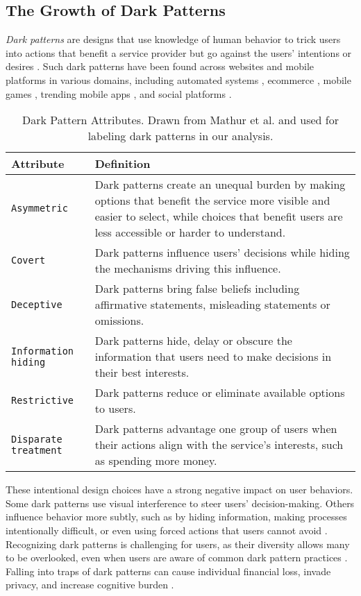 \subsection{The Growth of Dark Patterns} %
\textit{Dark patterns} are designs that use knowledge of human behavior to trick users into actions that benefit a service provider but go against the users' intentions or desires {\cite{a:10, a:11}}. Such dark patterns have been found across websites and mobile platforms in various domains, including automated systems \cite{a:45}, ecommerce \cite{a:9}, mobile games \cite{a:13}, trending mobile apps \cite{a:14}, and social platforms \cite{a:15, a:16}.

\setlength{\intextsep}{0pt}
\begin{wraptable}[25]{r}{8cm}
\begin{tabular}{l p{4.5cm}}\toprule  
Attribute & Definition \\\midrule
\texttt{Asymmetric}& Dark patterns create an unequal burden by making options that benefit the service more visible and easier to select, while choices that benefit users are less accessible or harder to understand. \\
\texttt{Covert}& Dark patterns influence users' decisions while hiding the mechanisms driving this influence.\\  
\texttt{Deceptive} & Dark patterns bring false beliefs including affirmative statements, misleading statements or omissions.\\  
\texttt{Information hiding} & Dark patterns hide, delay or obscure the information that users need to make decisions in their best interests.\\
\texttt{Restrictive} & Dark patterns reduce or eliminate available options to users. \\
\texttt{Disparate treatment}& Dark patterns advantage one group of users when their actions align with the service's interests, such as spending more money.\\
\bottomrule
\end{tabular}
\caption{Dark Pattern Attributes. Drawn from Mathur et al. \cite{a:44} and used for labeling dark patterns in our analysis.}\label{tab:darkpattern-definitions}
\end{wraptable}

These intentional design choices have a strong negative impact on user behaviors. Some dark patterns use visual interference to steer users' decision-making. Others influence behavior more subtly, such as by hiding information, making processes intentionally difficult, or even using forced actions that users cannot avoid \cite{a:23}. Recognizing dark patterns is challenging for users, as their diversity allows many to be overlooked, even when users are aware of common dark pattern practices \cite{a:42}. Falling into traps of dark patterns can cause individual financial loss, invade privacy, and increase cognitive burden \cite{a:44}.

